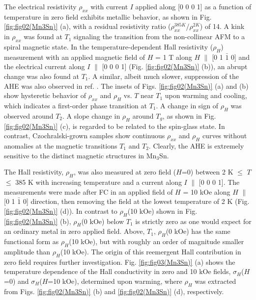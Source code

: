 \documentclass[prb,twocolumn,showpacs,preprintnumbers,amsmath,amssymb]{revtex4}
\begin{document}
The electrical resistivity $\rho_{xx}$ with current $I$ applied along [0 0 0 1] as a function of temperature in zero field exhibits metallic behavior, as shown in Fig. \ref{fig:fig02(Mn3Sn)} (a), with a residual resistivity ratio ($\rho_{xx}^{385 K}$/$\rho_{xx}^{2 K}$) of 14.  
A kink in $\rho_{xx}$ was found at $T_1$ signaling the transition from the non-collinear AFM to a spiral magnetic state.\cite{JWCable1993} 
In the temperature-dependent Hall resistivity ($\rho_{H}$) measurement with an applied magnetic field of $H$ = 1 T along $H$ $\parallel$ [0 1 $\bar{1}$ 0] and the electrical current along $I$ $\parallel$ [0 0 0 1] (Fig. \ref{fig:fig02(Mn3Sn)} (b)), an abrupt change was also found at $T_1$.
A similar, albeit much slower, suppression of the AHE was also observed in ref. \cite{arXiv161206128}.
The insets of Figs. \ref{fig:fig02(Mn3Sn)} (a) and (b) show hysteretic behavior of $\rho_{xx}$ and $\rho_{H}$ vs. $T$ near $T_1$ upon  warming and cooling, which indicates a first-order phase transition at $T_1$.
A change in sign of $\rho_{H}$ was observed around $T_2$.
A slope change in $\rho_{H}$ around $T_g$, as shown in Fig. \ref{fig:fig02(Mn3Sn)} (c), is regarded to be related to the spin-glass state.\cite{PRBglass2006}
In contrast, Czochralski-grown samples show continuous $\rho_{xx}$ and $\rho_{H}$ curves without anomalies at the magnetic transitions $T_1$ and $T_2$.\cite{Nakatsuji2015}
Clearly, the AHE is extremely sensitive to the distinct magnetic structures in Mn$_3$Sn.


The Hall resistivity, $\rho_{H}$, was also measured at zero field ($H$=0) between 2 K $\leq$ $T$ $\leq$ 385 K with increasing temperature and a current along $I$ $\parallel$ [0 0 0 1]. 
The measurements were made after FC in an applied field of $H$ = 10 kOe along $H$ $\parallel$ [0 1 $\bar{1}$ 0] direction, then removing the field at the lowest temperature of 2 K (Fig. \ref{fig:fig02(Mn3Sn)} (d)). 
In contrast to $\rho_H$(10 kOe) shown in Fig. \ref{fig:fig02(Mn3Sn)} (b), $\rho_H$(0 kOe) below $T_1$ is strictly zero as one would expect for an ordinary metal in zero applied field. 
Above, $T_1$, $\rho_H$(0 kOe) has the same functional form as $\rho_H$(10 kOe), but with roughly an order of magnitude smaller amplitude than $\rho_H$(10 kOe). 
The origin of this reemergent Hall contribution in zero field requires further investigation.
Fig. \ref{fig:fig03(Mn3Sn)} (a) shows the temperature dependence of the Hall conductivity in zero and 10 kOe fields, $\sigma_H$($H$=0) and $\sigma_H$($H$=10 kOe), determined upon warming, where $\rho_{H}$ was extracted from Figs. \ref{fig:fig02(Mn3Sn)} (b) and \ref{fig:fig02(Mn3Sn)} (d), respectively. 
\end{document}
